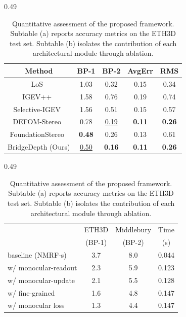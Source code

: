\begin{table}[!t]
	\centering
	\begin{subtable}{0.49\linewidth}
			\footnotesize
			\centering
			\begin{tabular}{c|cccc}
				\toprule
				Method & BP-1 & BP-2 & AvgErr & RMS \\
				\midrule
				LoS~\cite{li2024local} & 1.03 & 0.32 & 0.15 & 0.34\\
				IGEV++~\cite{xu2024igev++} & 1.58 & 0.76 & 0.19 & 0.74\\
				Selective-IGEV~\cite{wang2024selective} & 1.56 & 0.51 & 0.15 & 0.57\\
				DEFOM-Stereo~\cite{jiang2025defom} & 0.78 & \underline{0.19} & \textbf{0.11} & \textbf{0.26}\\
				FoundationStereo~\cite{wen2025foundationstereo} & \textbf{0.48} & 0.26 & 0.13 & 0.61\\
				BridgeDepth (Ours) & \underline{0.50} & \textbf{0.16} & \textbf{0.11} & \textbf{0.26}\\
				\bottomrule
			\end{tabular}
			\caption{Performance on ETH3D test split}
			\label{supp:tab_eth3d}
	\end{subtable}
	\hfill
	\begin{subtable}{0.49\linewidth}
		\footnotesize
		\begin{tabular}{l c c c}
			\toprule
			& ETH3D & Middlebury & Time \\
			& (BP-1) & (BP-2) & (s) \\
			\midrule
			baseline (NMRF-s) & 3.7 & 8.0 & 0.044\\
			w/ monocular-readout & 2.3 & 5.9 & 0.123\\
			w/ monocular-update & 2.1 & 5.5 & 0.128\\
			w/ fine-grained & 1.6 & 4.8 & 0.147\\
			w/ monocular loss & 1.3 & 4.4 & 0.147\\
			\bottomrule
		\end{tabular}
		\caption{Impact assessment of individual architecture modules.}
		\label{tab:bridge_abl}
	\end{subtable}
	\vspace{-1.0em}
	\caption{Quantitative assessment of the proposed framework. Subtable (a) reports accuracy metrics on the ETH3D test set. Subtable (b) isolates the contribution of each architectural module through ablation.}
\end{table}

